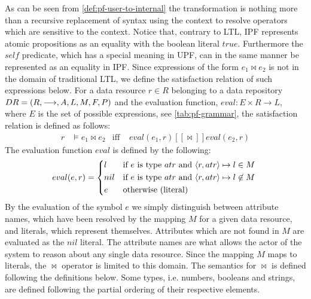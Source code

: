 As can be seen from \autoref{def:pf-user-to-internal} the transformation is nothing more than a recursive replacement of syntax using the context to resolve operators which are sensitive to the context. Notice that, contrary to LTL, IPF represents atomic propositions as an equality with the boolean literal $true$. Furthermore the $self$ predicate, which has a special meaning in UPF, can in the same manner be represented as an equality in IPF. Since expressions of the form $e_1 \bowtie e_2$ is not in the domain of traditional LTL, we define the satisfaction relation of such expressions below. For a data resource $r \in R$ belonging to a data repository $DR= \left( R, \longrightarrow, A, L, M, F, P \right)$ and the evaluation function, $eval : E \times R \rightarrow L$, where $E$ is the set of possible expressions, see \autoref{tab:pf-grammar}, the satisfaction relation is defined as follows:
\begin{align*}
    r &\models e_1 \bowtie e_2 &\text{iff }& eval(e_1, r) [\![ \bowtie ]\!] eval(e_2, r)
\end{align*}
The evaluation function $eval$ is defined by the following:
\begin{align*}
    eval(e,r) =
    \begin{cases*}
        l   & if $e$ is type $atr$ and $\langle r,atr\rangle \mapsto l \in M$ \\
        nil & if $e$ is type $atr$ and $\langle r,atr\rangle \mapsto l \not\in M$ \\
        e         & otherwise (literal)
    \end{cases*}
\end{align*}
By the evaluation of the symbol $e$ we simply distinguish between attribute names, which have been resolved by the mapping $M$ for a given data resource, and literals, which represent themselves. Attributes which are not found in $M$ are evaluated as the $nil$ literal. The attribute names are what allows the actor of the system to reason about any single data resource. Since the mapping $M$ maps to literals, the $\bowtie$ operator is limited to this domain. The semantics for $\bowtie$ is defined following the definitions below. Some types, i.e. numbers, booleans and strings, are defined following the partial ordering of their respective elements.
